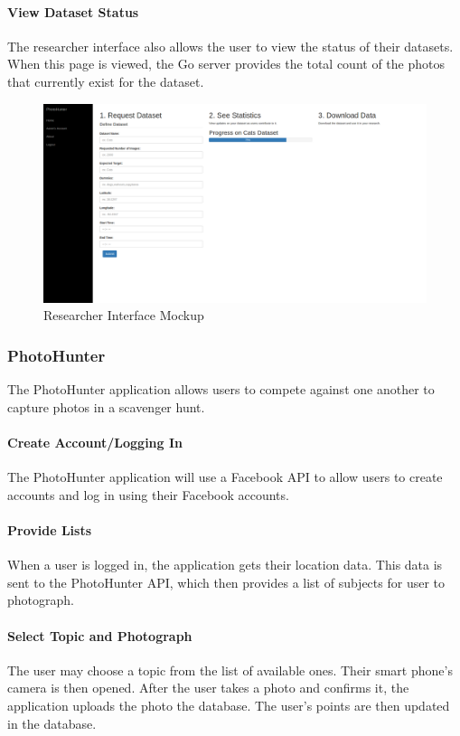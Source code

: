 \documentclass{article}
\begin{document}
\paragraph{View Dataset Status}
The researcher interface also allows the user to view the status of their
datasets. When this page is viewed, the Go server provides the total count of
the photos that currently exist for the dataset.

\begin{figure}[H]
  \caption{Researcher Interface Mockup}
  \centering
  \includegraphics[width=\textwidth,height=\textheight,keepaspectratio]{researchers}
\end{figure}

\subsubsection{PhotoHunter}
The PhotoHunter application allows users to compete against one another to
capture photos in a scavenger hunt.

\paragraph{Create Account/Logging In}
The PhotoHunter application will use a Facebook API to allow users to create
accounts and log in using their Facebook accounts.

\paragraph{Provide Lists}
When a user is logged in, the application gets their location data. This data
is sent to the PhotoHunter API, which then provides a list of subjects for user
to photograph.

\paragraph{Select Topic and Photograph}
The user may choose a topic from the list of available ones. Their smart
phone's camera is then opened. After the user takes a photo and confirms it,
the application uploads the photo the database. The user's points are then
updated in the database.
\end{document}
